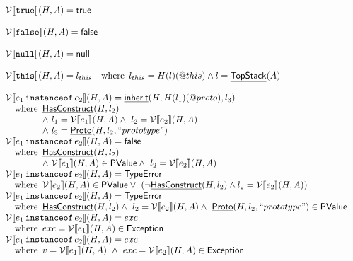 \[
\begin{array}{ll}

\V\lbr \TT{true} \rbr(H,A) = \vtrue\\\\

\V\lbr \TT{false} \rbr(H,A) = \vfalse\\\\

\V\lbr\TT{null}\rbr (H,A) = \SF{null}\\\\

\V\lbr \TT{this}\rbr (H,A) = l_{this} \quad\wherec{l_{this} = H(l)(\varprop{this})\land l = \chf{TopStack}(A)} \\\\

\V\lbr e_1\,\TT{instanceof}\,e_2 \rbr (H,A) = \chf{inherit}(H,H(l_1)(\varprop{proto}),l_3) \\
\quad\wherec{
  \chf{HasConstruct}(H,l_2) \\
  \land\ l_1 = \V\lbr e_1 \rbr (H,A)
  \land\ l_2 = \V\lbr e_2 \rbr (H,A) \\
  \land\ l_3 = \chf{Proto}(H,l_2,``prototype")
}
\\
\V\lbr e_1\,\TT{instanceof}\,e_2 \rbr (H,A) = \vfalse \\
\quad\wherec{
  \chf{HasConstruct}(H,l_2) \\
  \land\ \V\lbr e_1 \rbr (H,A)\in\SF{PValue}
  \land\ l_2 = \V\lbr e_2 \rbr (H,A) \\
}
\\
\V\lbr e_1\,\TT{instanceof}\,e_2 \rbr (H,A)
 = \exc{TypeError} \\
\quad\wherec{
  \V\lbr e_2\rbr (H,A)\in\SF{PValue}
  \lor\ 
  \left(\lnot\chf{HasConstruct}(H,l_2) \land l_2 = \V\lbr e_2 \rbr (H,A)\right)
}
\\
\V\lbr e_1\,\TT{instanceof}\,e_2 \rbr (H,A)
 = \exc{TypeError} \\
\quad\wherec{
  \chf{HasConstruct}(H,l_2)
  \land\ l_2 = \V\lbr e_2 \rbr (H,A)
  \land\ \chf{Proto}(H,l_2,``prototype")\in\SF{PValue}
}
\\
\V\lbr e_1\,\TT{instanceof}\,e_2 \rbr (H,A)
 = exc\\
\quad\wherec{
  exc=\V\lbr e_1\rbr(H,A) \in \SF{Exception}
}
\\
\V\lbr e_1\,\TT{instanceof}\,e_2 \rbr (H,A)
 = exc\\
\quad\wherec{
  v=\V\lbr e_1\rbr(H,A)
  \ \land\ exc=\V\lbr e_2\rbr(H,A) \in \SF{Exception}
}
\\\\

\end{array}\]
